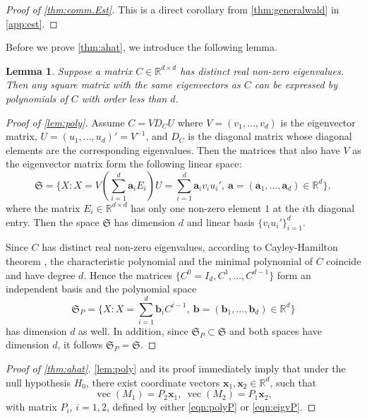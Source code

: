 \documentclass[12pt]{article}
\numberwithin{equation}{section}
\numberwithin{table}{section}
\newcommand{\R}{\mathbb{R}}
\numberwithin{thm}{section}
\numberwithin{defn}{section}
\newtheorem{lem}{Lemma}
\numberwithin{lem}{section}
\numberwithin{prop}{section}
\numberwithin{cor}{section}
\numberwithin{rem}{section}
\DeclareMathOperator{\Vector}{vec}
\begin{document}
\begin{appendix}
\begin{proof}[Proof of \autoref{thm:comm.Est}] 
This is a direct corollary from \autoref{thm:generalwald} in \autoref{app:est}.
\end{proof}


Before we prove \autoref{thm:ahat}, we introduce the following lemma.

\begin{lem}\label{lem:poly}
Suppose a matrix $C \in \R^{d \times d}$ has distinct real non-zero eigenvalues. Then any square matrix with the same eigenvectors as $C$ can be expressed by polynomials of $C$ with order less than $d$.
\end{lem}

\begin{proof}[Proof of \autoref{lem:poly}] \label{app:lempoly}
Assume $C = V D_C U$ where $V = (v_1, \dots, v_d)$ is the eigenvector matrix, $U = (u_1, \dots, u_d)' = V^{-1}$, and $D_C$ is the diagonal matrix whose diagonal elements are the corresponding eigenvalues. Then the matrices that also have $V$ as the eigenvector matrix form the following linear space:
$$
\mathfrak{S} = \{X: X = V (\sum_{i=1}^d \bm{a}_i E_i) U = \sum_{i=1}^d \bm{a}_i v_i u_i', ~ \bm{a} = (\bm{a}_1, \dots, \bm{a}_d) \in \mathbb{R}^{d}\},
$$
where the matrix $E_i \in \mathbb{R}^{d \times d}$ has only one non-zero element $1$ at the $i$th diagonal entry. Then the space $\mathfrak{S}$ has dimension $d$ and linear basis $\{v_i u_i'\}_{i=1}^d$.

Since $C$ has distinct real non-zero eigenvalues, according to Cayley-Hamilton theorem \citep[Theorem 2.4.3.2]{Horn}, the characteristic polynomial and the minimal polynomial of $C$ coincide and have degree $d$. Hence the matrices $\{C^0 = I_d, C^1, \dots, C^{d-1}\}$ form an independent basis and the polynomial space
$$
\mathfrak{S}_P = \{X: X = \sum_{i=1}^d \bm{b}_i C^{i-1}, ~ \bm{b} = (\bm{b}_1, \dots, \bm{b}_d) \in \mathbb{R}^{d}\}
$$
has dimension $d$ as well. In addition, since $\mathfrak{S}_P \subset \mathfrak{S}$ and both spaces have dimension $d$, it follows $\mathfrak{S}_P = \mathfrak{S}$.
\end{proof}

\begin{proof}[Proof of \autoref{thm:ahat}]

\autoref{lem:poly} and its proof immediately imply that under the null hypothesis $H_0$, there exist coordinate vectors $\bm{x}_1, \bm{x}_2 \in \R^d$, such that
\begin{equation}
    \Vector(M_1) = P_2 \bm{x}_1, ~ \Vector(M_2) = P_1 \bm{x}_2,\label{eq:x12}
\end{equation}
with matrix $P_i$, $i=1, 2$, defined by either \eqref{eqn:polyP} or \eqref{eqn:eigvP}.


\end{proof}
\end{appendix}
\end{document}
